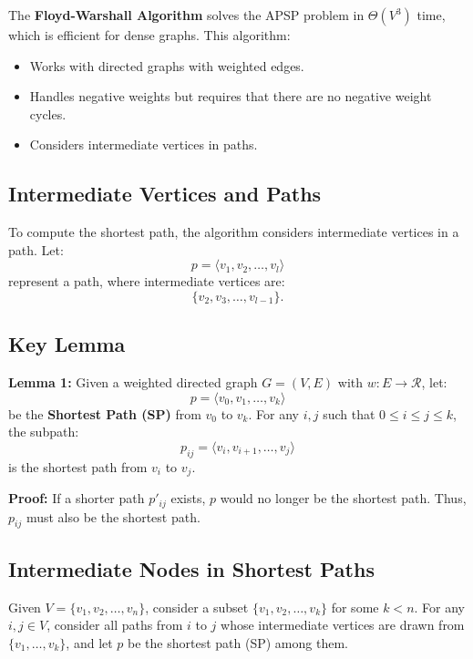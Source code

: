 The \textbf{Floyd-Warshall Algorithm} solves the APSP problem in \( \Theta(V^3) \) time, which is efficient for dense graphs. This algorithm:
\begin{itemize}
    \item Works with directed graphs with weighted edges.
    \item Handles negative weights but requires that there are no negative weight cycles.
    \item Considers intermediate vertices in paths.
\end{itemize}

\subsection{Intermediate Vertices and Paths}
To compute the shortest path, the algorithm considers intermediate vertices in a path. Let:
\[
p = \langle v_1, v_2, \dots, v_l \rangle
\]
represent a path, where intermediate vertices are:
\[
\{v_2, v_3, \dots, v_{l-1}\}.
\]

\subsection{Key Lemma}
\textbf{Lemma 1:}  
Given a weighted directed graph \( G = (V, E) \) with \( w: E \to \mathcal{R} \), let:
\[
p = \langle v_0, v_1, \dots, v_k \rangle
\]
be the \textbf{Shortest Path (SP)} from \( v_0 \) to \( v_k \). For any \( i, j \) such that \( 0 \leq i \leq j \leq k \), the subpath:
\[
p_{ij} = \langle v_i, v_{i+1}, \dots, v_j \rangle
\]
is the shortest path from \( v_i \) to \( v_j \).

\textbf{Proof:}  
If a shorter path \( p'_{ij} \) exists, \( p \) would no longer be the shortest path. Thus, \( p_{ij} \) must also be the shortest path.

\subsection{Intermediate Nodes in Shortest Paths}

Given \( V = \{v_1, v_2, \dots, v_n\} \), consider a subset \( \{v_1, v_2, \dots, v_k\} \) for some \( k < n \). For any \( i, j \in V \), consider all paths from \( i \) to \( j \) whose intermediate vertices are drawn from \( \{v_1, \dots, v_k\} \), and let \( p \) be the shortest path (SP) among them.

